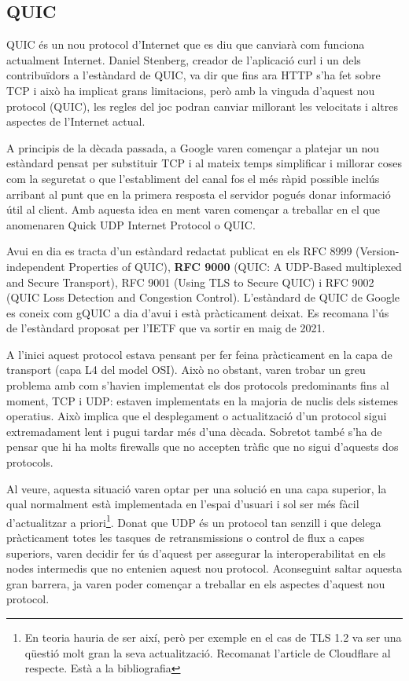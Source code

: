 \subsection{QUIC}
{   
    QUIC és un nou protocol d'Internet que es diu que canviarà com funciona actualment Internet. Daniel Stenberg, creador de
    l'aplicació curl i un dels contribuïdors a l'estàndard de QUIC, va dir que fins ara HTTP s'ha fet sobre TCP i això ha
    implicat grans limitacions, però amb la vinguda d'aquest nou protocol (QUIC), les regles del joc podran canviar
    millorant les velocitats i altres aspectes de l'Internet actual.

    A principis de la dècada passada, a Google varen començar a platejar un nou estàndard pensat per substituir TCP i al mateix
    temps simplificar i millorar coses com la seguretat o que l'establiment del canal fos el més ràpid possible inclús arribant
    al punt que en la primera resposta el servidor pogués donar informació útil al client. Amb aquesta idea en ment varen
    començar a treballar en el que anomenaren Quick UDP Internet Protocol o QUIC.

    Avui en dia es tracta d'un estàndard redactat publicat en els RFC 8999 (Version-independent Properties of QUIC),
    \textbf{RFC 9000} (QUIC: A UDP-Based multiplexed and Secure Transport), RFC 9001 (Using TLS to Secure QUIC) i RFC 9002 (QUIC Loss
    Detection and Congestion Control). L'estàndard de QUIC de Google es coneix com gQUIC a dia d'avui i està pràcticament deixat.
    Es recomana l'ús de l'estàndard proposat per l'IETF que va sortir en maig de 2021.

    A l'inici aquest protocol estava pensant per fer feina pràcticament en la capa de transport (capa L4 del model OSI). Això no obstant,
    varen trobar un greu problema amb com s'havien implementat els dos protocols predominants fins al moment, TCP i UDP: estaven
    implementats en la majoria de nuclis dels sistemes operatius. Això implica que el desplegament o actualització d'un protocol
    sigui extremadament lent i pugui tardar més d'una dècada. Sobretot també s'ha de pensar que hi ha molts firewalls que
    no accepten tràfic que no sigui d'aquests dos protocols.

    Al veure, aquesta situació varen optar per una solució en una capa superior, la qual normalment està implementada en l'espai d'usuari i
    sol ser més fàcil d'actualitzar a priori\footnote{En teoria hauria de ser així, però per exemple en el cas de TLS 1.2 va ser una qüestió
    molt gran la seva actualització. Recomanat l'article de Cloudflare al respecte. Està a la bibliografia}. Donat que UDP és un protocol
    tan senzill i que delega pràcticament totes les tasques de retransmissions o control de flux a capes superiors, varen decidir fer ús
    d'aquest per assegurar la interoperabilitat en els nodes intermedis que no entenien aquest nou protocol. Aconseguint saltar aquesta
    gran barrera, ja varen poder començar a treballar en els aspectes d'aquest nou protocol.
}

